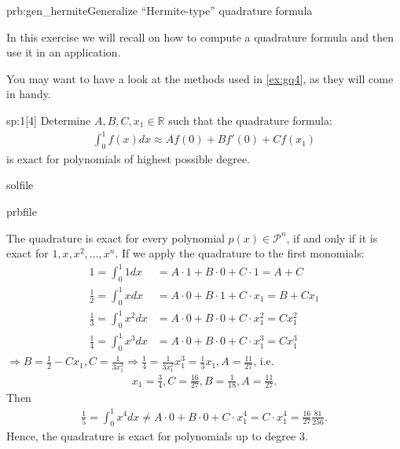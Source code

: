\begin{samproblem}{prb:gen_hermite}{Generalize ``Hermite-type'' quadrature formula}{
  In this exercise we will recall on how to compute a quadrature formula and then use it in an application.

  You may want to have a look at the methods used in \cref{ex:gq4}, as they will come in handy.
}
 
\begin{subproblem}{sp:1}[4]
  Determine $A,B,C, x_1 \in \mathbb{R}$ such that the quadrature formula:
  \begin{align}\label{eq:gen_hermite_quad}
    \int_0^1 f(x) dx \approx A f(0) + B f'(0) + C f(x_1)
  \end{align}
  is exact for polynomials of highest possible degree.
 
  \begin{samwriteprbpart}{solfile}
    \begin{writeverbatim}{prbfile}
      \begin{samsolution}
        The quadrature is exact for every polynomial $p(x) \in \mathcal{P}^n$, 
        if and only if it is exact for $1,x,x^2,\dots,x^n$. 
        If we apply the quadrature to the first monomials:
        \begin{align}
          1 = \int_0^1 1 dx & = A \cdot 1 + B \cdot 0 + C \cdot 1 = A + C\\
          \frac{1}{2} = \int_0^1 x dx & = A \cdot 0 + B \cdot 1 + C \cdot x_1 = B + C x_1 \\
          \frac{1}{3} = \int_0^1 x^2 dx & = A \cdot 0 + B \cdot 0 + C \cdot x_1^2 = C x_1^2 \\
          \frac{1}{4} = \int_0^1 x^3 dx & = A \cdot 0 + B \cdot 0 + C \cdot x_1^3 = C x_1^3
        \end{align}
        $\Rightarrow B = \frac{1}{2} - C x_1, C = \frac{1}{3 x_1^2} \Rightarrow \frac{1}{4} = \frac{1}{3 x_1^2} x_1^3 = \frac{1}{3} x_1, A = \frac{11}{27}$, i.e.
        \begin{align}
          x_1 = \frac{3}{4}, C = \frac{16}{27}, B = \frac{1}{18}, A = \frac{11}{27}.
        \end{align}
        Then
        \begin{align}
          \frac{1}{5} = \int_0^1 x^4 dx \neq A \cdot 0 + B \cdot 0 + C \cdot x_1^4 = C \cdot x_1^4 = \frac{16}{27} \frac{81}{256}.
        \end{align}
        Hence, the quadrature is exact for polynomials up to degree $3$.
      \end{samsolution}
    \end{writeverbatim}
  \end{samwriteprbpart}


\end{subproblem}
\end{samproblem}
